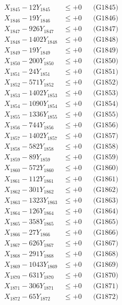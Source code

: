\documentclass[a4paper,10pt]{article}
\begin{document}
{\begin{align}
X_{1845} - 12Y_{1845} &\leq +0 && \text{(G1845)} \\
X_{1846} - 19Y_{1846} &\leq +0 && \text{(G1846)} \\
X_{1847} - 926Y_{1847} &\leq +0 && \text{(G1847)} \\
X_{1848} - 1402Y_{1848} &\leq +0 && \text{(G1848)} \\
X_{1849} - 19Y_{1849} &\leq +0 && \text{(G1849)} \\
X_{1850} - 200Y_{1850} &\leq +0 && \text{(G1850)} \\
\allowbreak
X_{1851} - 24Y_{1851} &\leq +0 && \text{(G1851)} \\
X_{1852} - 571Y_{1852} &\leq +0 && \text{(G1852)} \\
X_{1853} - 1402Y_{1853} &\leq +0 && \text{(G1853)} \\
X_{1854} - 1090Y_{1854} &\leq +0 && \text{(G1854)} \\
X_{1855} - 1336Y_{1855} &\leq +0 && \text{(G1855)} \\
X_{1856} - 744Y_{1856} &\leq +0 && \text{(G1856)} \\
X_{1857} - 1402Y_{1857} &\leq +0 && \text{(G1857)} \\
X_{1858} - 582Y_{1858} &\leq +0 && \text{(G1858)} \\
X_{1859} - 89Y_{1859} &\leq +0 && \text{(G1859)} \\
X_{1860} - 572Y_{1860} &\leq +0 && \text{(G1860)} \\
\allowbreak
X_{1861} - 112Y_{1861} &\leq +0 && \text{(G1861)} \\
X_{1862} - 301Y_{1862} &\leq +0 && \text{(G1862)} \\
X_{1863} - 1323Y_{1863} &\leq +0 && \text{(G1863)} \\
X_{1864} - 126Y_{1864} &\leq +0 && \text{(G1864)} \\
X_{1865} - 358Y_{1865} &\leq +0 && \text{(G1865)} \\
X_{1866} - 27Y_{1866} &\leq +0 && \text{(G1866)} \\
X_{1867} - 626Y_{1867} &\leq +0 && \text{(G1867)} \\
X_{1868} - 291Y_{1868} &\leq +0 && \text{(G1868)} \\
X_{1869} - 1043Y_{1869} &\leq +0 && \text{(G1869)} \\
X_{1870} - 631Y_{1870} &\leq +0 && \text{(G1870)} \\
\allowbreak
X_{1871} - 306Y_{1871} &\leq +0 && \text{(G1871)} \\
X_{1872} - 65Y_{1872} &\leq +0 && \text{(G1872)} \\

\end{align}}
\end{document}
